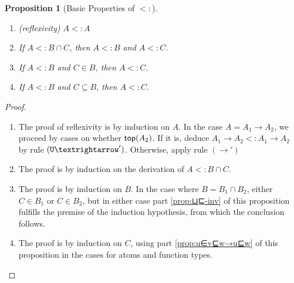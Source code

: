 \documentclass{article}
\newtheorem{proposition}[theorem]{Proposition}
\begin{document}
\begin{proposition}[Basic Properties of $<:$]\ \label{prop:subtyping}
  \begin{enumerate}
  \item (reflexivity) $A <: A$ \label{prop:⊑-refl}
  \item If $A <: B ∩ C$, then $A <: B$ and $A <: C$. \label{prop:⊔⊑-inv}
  \item If $A <: B$ and $C ∈ B$, then $A <: C$.\label{prop:u∈v⊑w→u⊑w}
  \item If $A <: B$ and $C ⊆ B$, then $A <: C$.\label{prop:u⊆v⊑w→u⊑w}
  \end{enumerate}
\end{proposition}
\begin{proof}\ 
  \begin{enumerate}
  \item The proof of reflexivity is by induction on $A$. In the case
    $A = A_1 → A_2$, we proceed by cases on whether $\mathsf{top}(A_2)$.
    If it is, deduce $A_1 → A_2 <: A_1 → A_2$ by rule $(\TOP{→}')$.
    Otherwise, apply rule $(→')$
  \item The proof is by induction on the derivation of $A <: B ∩ C$.
  \item The proof is by induction on $B$. In the case where $B = B_1
    ∩ B_2$, either $C ∈ B_1$ or $C ∈ B_2$, but in either case part
    \ref{prop:⊔⊑-inv} of this proposition fulfills the premise of
    the induction hypothesis, from which the conclusion follows.
  \item The proof  is by induction on $C$, using part \ref{prop:u∈v⊑w→u⊑w}
    of this proposition in the cases for atoms and function types.
  \end{enumerate}
\end{proof}
\end{document}

